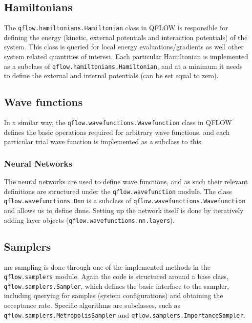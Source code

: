 \documentclass[Thesis.tex]{subfiles}
\begin{document}
\subsection{Hamiltonians}

The \texttt{qflow.\-hamiltonians.\-Hamiltonian} class in QFLOW is responsible for defining the energy
(kinetic, external potentials and interaction potentials) of the system. This
class is queried for local energy evaluations/gradients as well other system
related quantities of interest. Each particular Hamiltonian is implemented as a
subclass of \texttt{qflow.\-hamiltonians.\-Hamiltonian}, and at a minimum it needs to define the
external and internal potentials (can be set equal to zero).

\subsection{Wave functions}

In a similar way, the \texttt{qflow.\-wavefunctions.\-Wavefunction} class in QFLOW defines the basic
operations required for arbitrary wave functions, and each particular trial wave
function is implemented as a subclass to this.

\subsubsection{Neural Networks}

The neural networks are used to define wave functions, and as such their
relevant definitions are structured under the \texttt{qflow.\-wavefunction} module. The
class \texttt{qflow.\-wavefunctions.\-Dnn}  is a subclass of
\texttt{qflow.\-wavefunctions.\-Wavefunction} and allows us to define \glspl{dnn}.
Setting up the network itself is done by iteratively adding layer objects (\texttt{qflow.\-wavefunctions.\-nn.\-layers}).

\subsection{Samplers}

\gls{mc} sampling is done through one of the implemented methods in the
\texttt{qflow.\-samplers} module. Again the code is structured around a base
class, \texttt{qflow.\-samplers.\-Sampler}, which defines the basic interface to the
sampler, including querying for samples (system configurations) and obtaining
the acceptance rate. Specific algorithms are subclasses, such as
\texttt{qflow.\-samplers.\-MetropolisSampler} and
\texttt{qflow.\-samplers.\-ImportanceSampler}.
\end{document}
